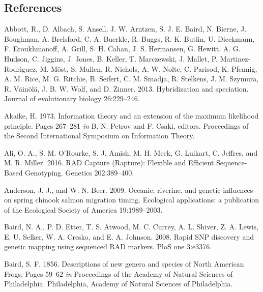 \documentclass[proquest,12pt,final]{ucthesis-CA2012} %
\begin{document}
\begin{ucmainmatter}
{\chapter*{References}\label{references}}


\noindent

\setlength{\parindent}{-0.20in}
\setlength{\leftskip}{0.20in}
\setlength{\parskip}{8pt}

\hypertarget{refs}{}
\leavevmode\hypertarget{ref-abbott_hybridization_2013}{}%
Abbott, R., D. Albach, S. Ansell, J. W. Arntzen, S. J. E. Baird, N.
Bierne, J. Boughman, A. Brelsford, C. A. Buerkle, R. Buggs, R. K.
Butlin, U. Dieckmann, F. Eroukhmanoff, A. Grill, S. H. Cahan, J. S.
Hermansen, G. Hewitt, A. G. Hudson, C. Jiggins, J. Jones, B. Keller, T.
Marczewski, J. Mallet, P. Martinez-Rodriguez, M. Möst, S. Mullen, R.
Nichols, A. W. Nolte, C. Parisod, K. Pfennig, A. M. Rice, M. G. Ritchie,
B. Seifert, C. M. Smadja, R. Stelkens, J. M. Szymura, R. Väinölä, J. B.
W. Wolf, and D. Zinner. 2013. Hybridization and speciation. Journal of
evolutionary biology 26:229--246.

\leavevmode\hypertarget{ref-akaike_information_1973}{}%
Akaike, H. 1973. Information theory and an extension of the maximum
likelihood principle. Pages 267--281 \emph{in} B. N. Petrov and F.
Csaki, editors. Proceedings of the Second International Symposium on
Information Theory.

\leavevmode\hypertarget{ref-ali_rad_2016}{}%
Ali, O. A., S. M. O'Rourke, S. J. Amish, M. H. Meek, G. Luikart, C.
Jeffres, and M. R. Miller. 2016. RAD Capture (Rapture): Flexible and
Efficient Sequence-Based Genotyping. Genetics 202:389--400.

\leavevmode\hypertarget{ref-anderson_oceanic_2009}{}%
Anderson, J. J., and W. N. Beer. 2009. Oceanic, riverine, and genetic
influences on spring chinook salmon migration timing. Ecological
applications: a publication of the Ecological Society of America
19:1989--2003.

\leavevmode\hypertarget{ref-baird_rapid_2008}{}%
Baird, N. A., P. D. Etter, T. S. Atwood, M. C. Currey, A. L. Shiver, Z.
A. Lewis, E. U. Selker, W. A. Cresko, and E. A. Johnson. 2008. Rapid SNP
discovery and genetic mapping using sequenced RAD markers. PloS one
3:e3376.

\leavevmode\hypertarget{ref-baird_descriptions_1856}{}%
Baird, S. F. 1856. Descriptions of new genera and species of North
American Frogs. Pages 59--62 \emph{in} Proceedings of the Academy of
Natural Sciences of Philadelphia. Philadelphia, Academy of Natural
Sciences of Philadelphia.


\end{ucmainmatter}
\end{document}
